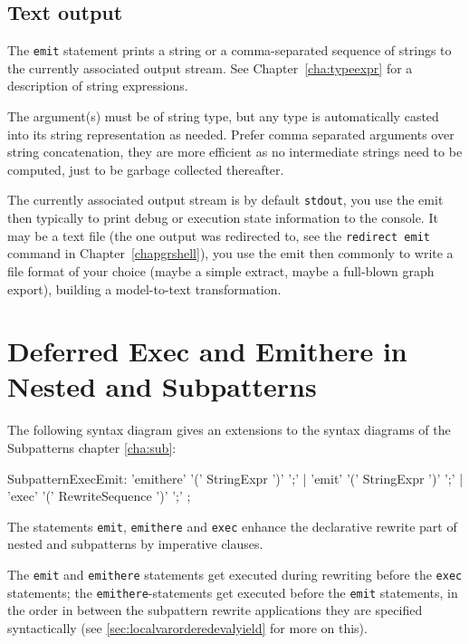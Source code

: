 \subsection*{Text output}
The \texttt{emit} statement prints a string or a comma-separated sequence of strings to the currently associated output stream. See Chapter~\ref{cha:typeexpr} for a description of string expressions.

The argument(s) must be of string type, but any type is automatically casted into its string representation as needed. Prefer comma separated arguments over string concatenation, they are more efficient as no intermediate strings need to be computed, just to be garbage collected thereafter.

The currently associated output stream is by default \texttt{stdout}, you use the emit then typically to print debug or execution state information to the console.
It may be a text file (the one output was redirected to, see the \texttt{redirect emit} command in Chapter~\ref{chapgrshell}), you use the emit then commonly to write a file format of your choice (maybe a simple extract, maybe a full-blown graph export), building a model-to-text transformation.

\section{Deferred Exec and Emithere in Nested and Subpatterns}\label{sec:deferredexecemithere}

The following syntax diagram gives an extensions to the syntax diagrams of the Subpatterns chapter \ref{cha:sub}:
\begin{rail}
  SubpatternExecEmit:
		'emithere' '(' StringExpr ')' ';' |
		'emit' '(' StringExpr ')' ';' |
		'exec' '(' RewriteSequence ')' ';'
	;
\end{rail}

The statements \texttt{emit}, \texttt{emithere} and \texttt{exec} enhance the declarative rewrite part of nested and subpatterns by imperative clauses.

The \texttt{emit} and \texttt{emithere} statements get executed during rewriting before the \texttt{exec} statements;
the \texttt{emithere}-statements get executed before the \texttt{emit} statements,
in the order in between the subpattern rewrite applications they are specified syntactically
(see \ref{sec:localvarorderedevalyield} for more on this).

